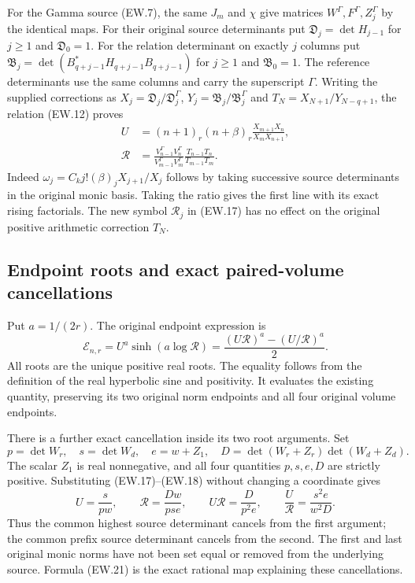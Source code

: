 For the Gamma source (EW.7), the same $J_m$ and $\chi$ give
matrices $W^\Gamma,F^\Gamma,Z_j^\Gamma$ by the identical maps.
For their original source determinants put
$\mathfrak D_j=\det H_{j-1}$ for $j\ge1$ and
$\mathfrak D_0=1$. For the relation determinant on exactly $j$
columns put
$\mathfrak B_j=\det(B_{q+j-1}^*H_{q+j-1}B_{q+j-1})$ for
$j\ge1$ and $\mathfrak B_0=1$. The reference determinants use
the same columns and carry the superscript $\Gamma$.
Writing the supplied corrections as
$X_j=\mathfrak D_j/\mathfrak D_j^\Gamma$,
$Y_j=\mathfrak B_j/\mathfrak B_j^\Gamma$ and
$T_N=X_{N+1}/Y_{N-q+1}$, the relation (EW.12) proves
\[
 \begin{split}
 U&=(n+1)_r(n+\beta)_r
       \frac{X_{m+1}X_n}{X_mX_{n+1}},\\
 \mathscr R&=\frac{V_{n-1}^\Gamma V_n^\Gamma}
                    {V_{m-1}^\Gamma V_m^\Gamma}
             \frac{T_{n-1}T_n}{T_{m-1}T_m}.
 \end{split}                                                   \tag{EW.19}
\]
Indeed $\omega_j=C_kj!(\beta)_jX_{j+1}/X_j$ follows by
taking successive source determinants in the original monic basis.
Taking the ratio gives the first line with its exact rising factorials.
The new symbol $\mathscr R_j$ in (EW.17) has no effect on the
original positive arithmetic correction $T_N$.

\subsection{Endpoint roots and exact paired-volume cancellations}

Put $a=1/(2r)$. The original endpoint expression is
\[
 \mathcal E_{n,r}=U^a\sinh(a\log\mathscr R)
   =\frac{(U\mathscr R)^a-(U/\mathscr R)^a}{2}.              \tag{EW.20}
\]
All roots are the unique positive real roots. The equality follows
from the definition of the real hyperbolic sine and positivity.
It evaluates the existing quantity, preserving its two original norm
endpoints and all four original volume endpoints.

There is a further exact cancellation inside its two root arguments.
Set
\[
 p=\det W_r,\quad s=\det W_d,\quad
 e=w+Z_1,\quad
 D=\det(W_r+Z_r)\det(W_d+Z_d).
\]
The scalar $Z_1$ is real nonnegative, and all four quantities
$p,s,e,D$ are strictly positive. Substituting (EW.17)--(EW.18)
without changing a coordinate gives
\[
 U=\frac{s}{pw},\qquad\mathscr R=\frac{Dw}{pse},\qquad
 \boxed{U\mathscr R=\frac{D}{p^2e},\qquad
        \frac U{\mathscr R}=\frac{s^2e}{w^2D}.}              \tag{EW.21}
\]
Thus the common highest source determinant cancels from the first
argument; the common prefix source determinant cancels from the
second. The first and last original monic norms have not been set
equal or removed from the underlying source. Formula (EW.21) is the
exact rational map explaining these cancellations.

